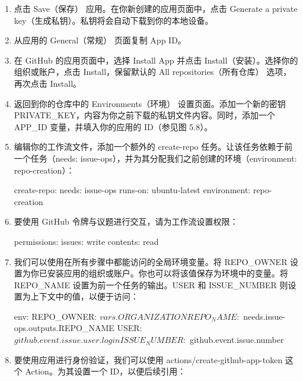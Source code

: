 \begin{enumerate}
\item 
点击 Save（保存） 应用。在你新创建的应用页面中，点击 Generate a private key（生成私钥）。私钥将会自动下载到你的本地设备。

\item 
从应用的 General（常规） 页面复制 App ID。

\item 
在 GitHub 的应用页面中，选择 Install App 并点击 Install（安装）。选择你的组织或账户，点击 Install，保留默认的 All repositories（所有仓库） 选项，再次点击 Install。

\item 
返回到你的仓库中的 Environments（环境） 设置页面。添加一个新的密钥 PRIVATE\_KEY，内容为你之前下载的私钥文件内容。同时，添加一个 APP\_ID 变量，并填入你的应用的 ID（参见图 5.8）。


\item 
编辑你的工作流文件，添加一个额外的 create-repo 任务。让该任务依赖于前一个任务（needs: issue-ops），并为其分配我们之前创建的环境（environment: repo-creation）：

\begin{shell}
create-repo:
  needs: issue-ops
  runs-on: ubuntu-latest
  environment: repo-creation
\end{shell}

\item 
要使用 GitHub 令牌与议题进行交互，请为工作流设置权限：

\begin{shell}
  permissions:
    issues: write
    contents: read
\end{shell}

\item 
我们可以使用在所有步骤中都能访问的全局环境变量。将 REPO\_OWNER 设置为你已安装应用的组织或账户。你也可以将该值保存为环境中的变量。将 REPO\_NAME 设置为前一个任务的输出。USER 和 ISSUE\_NUMBER 则设置为上下文中的值，以便于访问：

\begin{shell}
env:
  REPO_OWNER: ${{ vars.ORGANIZATION }}
  REPO_NAME: ${{ needs.issue-ops.outputs.REPO_NAME }}
  USER: ${{ github.event.issue.user.login }}
  ISSUE_NUMBER: ${{ github.event.issue.number }}
\end{shell}

\item 
要使用应用进行身份验证，我们可以使用 actions/create-github-app-token 这个 Action。为其设置一个 ID，以便后续引用：


\end{enumerate}
